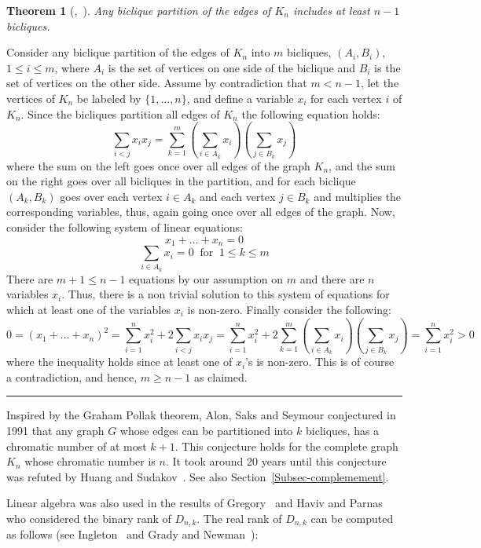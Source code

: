 \documentclass[11pt]{article}
\newtheorem{theorem}{Theorem}
\newcommand{\qedsymb}{\hfill{\rule{2mm}{2mm}}}
\renewenvironment{proof}[1][]{\begin{trivlist}
\item[\hspace{\labelsep}{\bf\noindent Proof#1:\/}] }{\qedsymb\end{trivlist}}
\begin{document}
\begin{theorem}[\cite{GrahamP71},~\cite{Tverberg1982OnTD}]
Any biclique partition of the edges of $K_n$  includes at least $n-1$ bicliques.
\end{theorem}
\begin{proof}
 Consider any biclique partition of the edges of $K_n$ into $m $ bicliques, $(A_i,B_i)$,  $1 \leq i \leq m$,
where $A_i$ is the set of vertices on one side of the biclique and $B_i$ is the set of vertices on the other side.
Assume by contradiction that $m < n-1 $, let the vertices of $K_n$ be labeled by $\{1,...,n\}$,
and define a variable $x_i$ for each vertex $i$ of $K_n$. Since the bicliques partition all edges of $K_n$ the following equation holds:
$$
\sum_{i < j} x_i x_j = \sum_{k = 1}^m \left(\sum_{i \in A_k} x_i \right) \left( \sum_{j \in B_k} x_j \right)
$$
where the sum on the left goes once over all edges of the graph $K_n$, and the sum on the right goes over all bicliques in the partition, and for each biclique $(A_k,B_k)$
goes over each vertex  $i \in A_k$ and each vertex  $j \in B_k$ and multiplies the corresponding variables, thus, again going once over all edges of the graph.
Now, consider the following system of linear equations:
$$
x_1 + ... + x_n = 0
$$
$$
\sum_{i \in A_k} x_i = 0\;\; \text{for} \;\; 1 \leq k \leq m
$$
There are $m + 1 \leq n-1$ equations by our assumption on $m$ and there are $n$ variables $x_i$. Thus, there is a non trivial solution to this system of equations
for which at least one of the variables $x_i $ is non-zero.
Finally consider the following:
$$
0 = (x_1 + ... + x_n)^2 = \sum_{i = 1}^n x_i^2 + 2 \sum_{i < j} x_i x_j = \sum_{i = 1}^n x_i^2 + 2 \sum_{k = 1}^m \left(\sum_{i \in A_k} x_i \right) \left( \sum_{j \in B_k} x_j \right)
 = \sum_{i = 1}^n x_i^2 > 0
$$
where the inequality holds since at least one of $x_i$'s is non-zero.
This is of course a contradiction, and hence, $m \geq n-1$ as claimed.
\end{proof}

Inspired by the Graham Pollak theorem, Alon, Saks and Seymour conjectured in 1991 that any graph $G$ whose edges can be partitioned into $k$ bicliques, has a chromatic number of at most $k+1$.
This conjecture holds for the complete graph $K_n$ whose chromatic number is $n$. It took around 20 years until this conjecture was refuted by Huang and Sudakov~\cite{HuangS12}.
See also Section~\ref{Subsec-complemement}.

Linear algebra was also used in the results of Gregory~\cite{gregory1989biclique} and Haviv and Parnas~\cite{haviv2023binary} who considered the binary rank of $D_{n,k}$.
The real rank of $D_{n,k}$ can be computed as follows (see Ingleton~\cite{ingleton1956rank} and Grady and Newman~\cite{GRADY199711}):
\end{document}
